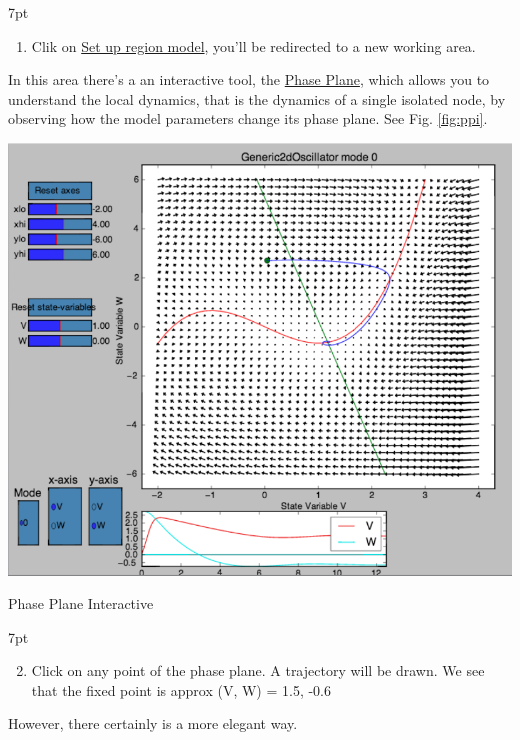 \documentclass{tufte-handout}
\newenvironment{simulation}{%
  \def\FrameCommand{%
    \hspace{1pt}%
    {\color{ForestGreen}\vrule width 2pt}%
    {\color{simulationshade}\vrule width 4pt}%
    \colorbox{simulationshade}%
  }%
  \MakeFramed{\advance\hsize-\width\FrameRestore}%
  \noindent\hspace{-4.55pt}%
  \begin{adjustwidth}{}{7pt}%
  \vspace{2pt}\vspace{2pt}%
}
{%
  \vspace{2pt}\end{adjustwidth}\endMakeFramed%
}
\begin{document}
\begin{simulation}
\begin{enumerate}
\item  Clik on \underline{Set up region model}, you'll be redirected to a new working area. 
\end{enumerate}
\end{simulation}


In this area there's a an interactive tool, the \underline{Phase Plane}, which allows you to understand the local dynamics, that is the dynamics of a single isolated node, by observing how the model parameters change its phase plane. See Fig. \ref{fig:ppi}.

\begin{marginfigure}%
  \includegraphics[width=\linewidth]{Handout_UI_BuildingYourOwnBrainNetworkModel_PhasePlane}%
  \caption{Phase Plane Interactive}%
  \label{fig:ppi}%
\end{marginfigure}%

\begin{simulation}
\begin{enumerate}[resume]
  \setcounter{enumi}{1}
\item  Click on any point of the phase plane. A trajectory will be drawn.
We see that the fixed point is approx (V, W) = 1.5, -0.6
\end{enumerate}
\end{simulation}


However, there certainly is a more elegant way. 
\end{document}
